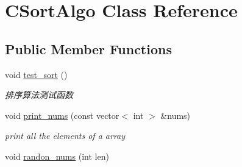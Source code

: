 \hypertarget{class_c_sort_algo}{}\section{C\+Sort\+Algo Class Reference}
\label{class_c_sort_algo}
\subsection*{Public Member Functions}
\begin{DoxyCompactItemize}
\item 
\hypertarget{class_c_sort_algo_a2eb6522682aab00c1df2eb3798912c97}{}\label{class_c_sort_algo_a2eb6522682aab00c1df2eb3798912c97} 
void \hyperlink{class_c_sort_algo_a2eb6522682aab00c1df2eb3798912c97}{test\+\_\+sort} ()
\begin{DoxyCompactList}\small\item\em 排序算法测试函数 \end{DoxyCompactList}\item 
void \hyperlink{class_c_sort_algo_a73fd2ee73bc017fdd76eb8bdab10c02d}{print\+\_\+nums} (const vector$<$ int $>$ \&nums)
\begin{DoxyCompactList}\small\item\em print all the elements of a array \end{DoxyCompactList}\item 
void \hyperlink{class_c_sort_algo_a3e16fa837f31b55a907c2ae08010441c}{randon\+\_\+nums} (int len)
\end{DoxyCompactItemize}
